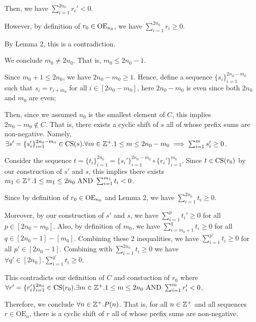 \documentclass[11pt, brown, sepia, 1in]{hw}
\begin{document}
{{{{{                    Then, we have $\sum_{i=1}^{2n_0} r_i'<0$.

                    However, by definition of $r_0\in\text{OE}_{n_0}$, we have $\sum_{i=1}^{2n_0} r_i\geq0$.

                    By Lemma 2, this is a contradiction.
                }

                We conclude $m_0\neq 2n_0$. That is, $m_0\leq 2n_0-1$.

                Since $m_0+1\leq 2n_0$, we have $2n_0-m_0\geq1$. Hence, define a sequence $\{s_i\}_{i=1}^{2n_0-m_0}$ such that $s_i=r_{i+m_0}$ for all $i\in[2n_0-m_0]$, here $2n_0-m_0$ is even since both $2n_0$ and $m_0$ are even;

                Then, since we assumed $n_0$ is the smallest element of $C$, this implies $2n_0-m_0\notin C$. That is, there exists a cyclic shift of $s$ all of whose prefix sums are non-negative. Namely, $\exists s'=\{s_i'\}_{i=1}^{2n_0-m_0}\in\text{CS}(s). \forall m\in\mathbb{Z}^+. 1\leq m\leq 2n_0-m_0\implies \sum_{i=1}^m s_i'\geq0$.

                Consider the sequence $t=\{t_i\}_{i=1}^{2n_0}=\{s_i'\}_{i=1}^{2n_0-m_0}\circ\{r_i'\}_{i=1}^{m_0}$. Since $t\in\text{CS}(r_0)$ by our construction of $s'$ and $s$, this implies there exists $m_1\in\mathbb{Z}^+. 1\leq m_1\leq 2n_0 \,\,\mathrm{AND}\,\, \sum_{i=1}^{m_1} t_i<0$.

                Since by definition of $r_0\in\text{OE}_{n_0}$ and Lemma 2, we have $\sum_{i=1}^{2n_0} t_i\geq0$. 
                
                Moreover, by our construction of $s'$ and $s$, we have $\sum_{i=1}^{p} t_i'\geq0$ for all $p\in[2n_0-m_0]$. Also, by definition of $m_0$, we have $\sum_{i=m_0+1}^{q} t_i\geq0$ for all $q\in[2n_0-1]-[m_0]$. Combining these 2 inequalities, we have $\sum_{i=1}^{p'} t_i\geq0$ for all $p'\in[2n_0-1]$. Combining with $\sum_{i=1}^{2n_0} t_i\geq0$ we have $\forall q'\in[2n_0].\sum_{i=1}^{q'} t_i\geq0$.
            }
        }

        This contradicts our definition of $C$ and constuction of $r_0$ where $\forall r'=\{r_i'\}_{i=1}^{2n_0}\in\text{CS}(r_0). \exists m\in\mathbb{Z}^+. 1\leq m\leq 2n_0 \,\,\mathrm{AND}\,\, \sum_{i=1}^m r_i'<0$.
    }

    Therefore, we conclude $\forall n\in\mathbb{Z}^+. P(n)$. That is, for all $n\in\mathbb{Z}^+$ and all sequences $r\in\text{OE}_n$, there is a cyclic shift of $r$ all of whose prefix sums are non-negative.
}
\end{document}
